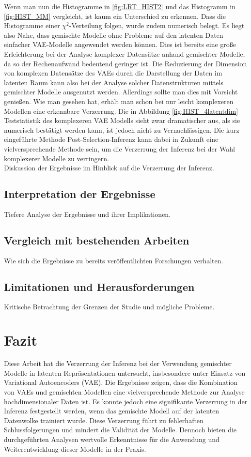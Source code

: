 \documentclass[%
thesis=student,%
coverpage=false,%
titlepage=false,%
headmarks=true, %
german,%
font=libertine, %
math=newpxtx, %
BCOR=5mm,%
coverBCOR=11mm%
]{tumbook}
\theoremstyle{break}
\begin{document}
Wenn man nun die Histogramme in \ref{fig:LRT_HIST2} und das Histogramm in \ref{fig:HIST_MM} vergleicht, ist kaum ein Unterschied zu erkennen. Dass die Histogramme einer $\chi^2$-Verteilung folgen, wurde zudem numerisch belegt. Es liegt also Nahe, dass gemischte Modelle ohne Probleme auf den latenten Daten einfacher VAE-Modelle angewendet werden können. Dies ist bereits eine große Erleichterung bei der Analyse komplexer Datensätze anhand gemischter Modelle, da so der Rechenaufwand bedeutend geringer ist. Die Reduzierung der Dimension von komplexen Datensätze des VAEs durch die Darstellung der Daten im latenten Raum kann also bei der Analyse solcher Datenstrukturen mittels gemischter Modelle ausgenutzt werden. Allerdings sollte man dies mit Vorsicht genießen. Wie man gesehen hat, erhält man schon bei nur leicht komplexeren Modellen eine erkennbare Verzerrung. Die in Abbildung \ref{fig:HIST_4latentdim} Teststatistik des komplexeren VAE Modells sieht zwar dramatischer aus, als sie numerisch bestätigt werden kann, ist jedoch nicht zu Vernachlässigen. Die kurz eingeführte Methode Post-Selection-Inferenz kann dabei in Zukunft eine vielversprechende Methode sein, um die Verzerrung der Inferenz bei der Wahl komplexerer Modelle zu verringern.
\\
Diskussion der Ergebnisse im Hinblick auf die Verzerrung der Inferenz.

\section{Interpretation der Ergebnisse}
Tiefere Analyse der Ergebnisse und ihrer Implikationen.
\section{Vergleich mit bestehenden Arbeiten}
Wie sich die Ergebnisse zu bereits veröffentlichten Forschungen verhalten.
\section{Limitationen und Herausforderungen}
Kritische Betrachtung der Grenzen der Studie und mögliche Probleme.
\chapter{Fazit}
Diese Arbeit hat die Verzerrung der Inferenz bei der Verwendung gemischter Modelle in latenten Repräsentationen untersucht, insbesondere unter Einsatz von Variational Autoencoders (VAE). Die Ergebnisse zeigen, dass die Kombination von VAEs und gemischten Modellen eine vielversprechende Methode zur Analyse hochdimensionaler Daten ist. Es konnte jedoch eine signifikante Verzerrung in der Inferenz festgestellt werden, wenn das gemischte Modell auf der latenten Datenwolke trainiert wurde. Diese Verzerrung führt zu fehlerhaften Schlussfolgerungen und mindert die Validität der Modelle. Dennoch bieten die durchgeführten Analysen wertvolle Erkenntnisse für die Anwendung und Weiterentwicklung dieser Modelle in der Praxis.
\end{document}
